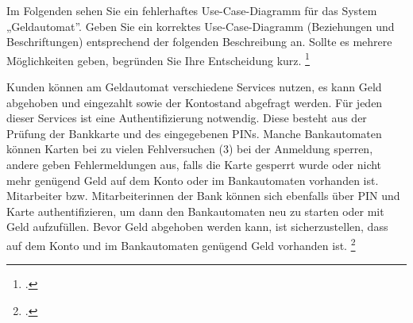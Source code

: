 \documentclass{bschlangaul-aufgabe}
\begin{document}

Im Folgenden sehen Sie ein fehlerhaftes Use-Case-Diagramm für das System
„Geldautomat”. Geben Sie ein korrektes Use-Case-Diagramm (Beziehungen
und Beschriftungen) entsprechend der folgenden Beschreibung an. Sollte
es mehrere Möglichkeiten geben, begründen Sie Ihre Entscheidung kurz.
\footcite{examen:46116:2017:03}

Kunden können am Geldautomat verschiedene Services nutzen, es kann Geld
abgehoben und eingezahlt sowie der Kontostand abgefragt werden. Für
jeden dieser Services ist eine Authentifizierung notwendig. Diese
besteht aus der Prüfung der Bankkarte und des eingegebenen PINs. Manche
Bankautomaten können Karten bei zu vielen Fehlversuchen (3) bei der
Anmeldung sperren, andere geben Fehlermeldungen aus, falls die Karte
gesperrt wurde oder nicht mehr genügend Geld auf dem Konto oder im
Bankautomaten vorhanden ist. Mitarbeiter bzw. Mitarbeiterinnen der Bank
können sich ebenfalls über PIN und Karte authentifizieren, um dann den
Bankautomaten neu zu starten oder mit Geld aufzufüllen. Bevor Geld
abgehoben werden kann, ist sicherzustellen, dass auf dem Konto und im
Bankautomaten genügend Geld vorhanden ist.
\footcite[Aufgabe 3]{sosy:ab:3}
\end{document}
